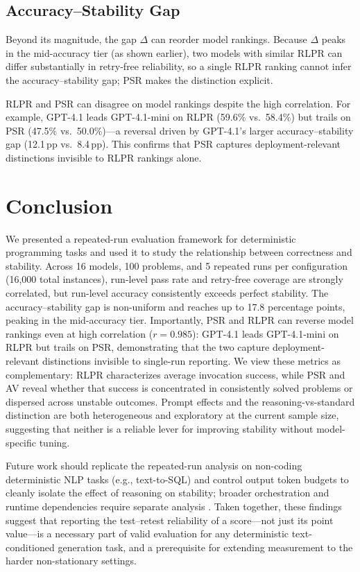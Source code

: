 \documentclass{article}
\begin{document}
\subsection{Accuracy--Stability Gap}
\label{sec:gap}

Beyond its magnitude, the gap $\Delta$ can reorder model rankings. Because $\Delta$ peaks in the mid-accuracy tier (as shown earlier), two models with similar RLPR can differ substantially in retry-free reliability, so a single RLPR ranking cannot infer the accuracy--stability gap; PSR makes the distinction explicit.

RLPR and PSR can disagree on model rankings despite the high correlation. For example, GPT-4.1 leads GPT-4.1-mini on RLPR (59.6\% vs.\ 58.4\%) but trails on PSR (47.5\% vs.\ 50.0\%)---a reversal driven by GPT-4.1's larger accuracy--stability gap (12.1\,pp vs.\ 8.4\,pp). This confirms that PSR captures deployment-relevant distinctions invisible to RLPR rankings alone.

\section{Conclusion}

We presented a repeated-run evaluation framework for deterministic programming tasks and used it to study the relationship between correctness and stability. Across 16 models, 100 problems, and 5 repeated runs per configuration (16{,}000 total instances), run-level pass rate and retry-free coverage are strongly correlated, but run-level accuracy consistently exceeds perfect stability. The accuracy--stability gap is non-uniform and reaches up to 17.8 percentage points, peaking in the mid-accuracy tier. Importantly, PSR and RLPR can reverse model rankings even at high correlation ($r=0.985$): GPT-4.1 leads GPT-4.1-mini on RLPR but trails on PSR, demonstrating that the two capture deployment-relevant distinctions invisible to single-run reporting. We view these metrics as complementary: RLPR characterizes average invocation success, while PSR and AV reveal whether that success is concentrated in consistently solved problems or dispersed across unstable outcomes. Prompt effects and the reasoning-vs-standard distinction are both heterogeneous and exploratory at the current sample size, suggesting that neither is a reliable lever for improving stability without model-specific tuning.

Future work should replicate the repeated-run analysis on non-coding deterministic NLP tasks (e.g., text-to-SQL) and control output token budgets to cleanly isolate the effect of reasoning on stability; broader orchestration and runtime dependencies require separate analysis \citep{jiang2026agenticaicybersecurityattack}. Taken together, these findings suggest that reporting the test--retest reliability of a score---not just its point value---is a necessary part of valid evaluation for any deterministic text-conditioned generation task, and a prerequisite for extending measurement to the harder non-stationary settings.
\end{document}
